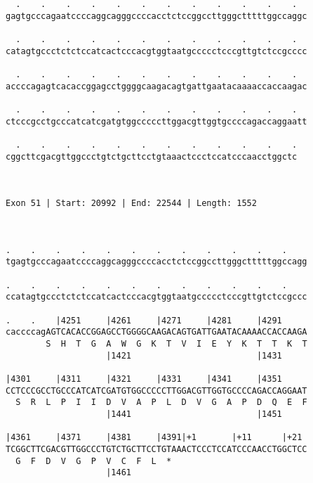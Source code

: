 \documentclass{article}
\begin{document}
\begin{Verbatim}
  .    .    .    .    .    .    .    .    .    .    .    .  
gagtgcccagaatccccaggcagggccccacctctccggccttgggctttttggccaggc
                                                            
  .    .    .    .    .    .    .    .    .    .    .    .  
catagtgccctctctccatcactcccacgtggtaatgccccctcccgttgtctccgcccc
                                                            
  .    .    .    .    .    .    .    .    .    .    .    .  
accccagagtcacaccggagcctggggcaagacagtgattgaatacaaaaccaccaagac
                                                            
  .    .    .    .    .    .    .    .    .    .    .    .  
ctcccgcctgcccatcatcgatgtggcccccttggacgttggtgccccagaccaggaatt
                                                            
  .    .    .    .    .    .    .    .    .    .    .    .
cggcttcgacgttggccctgtctgcttcctgtaaactccctccatcccaacctggctc
                                                          
                                                          
 
Exon 51 | Start: 20992 | End: 22544 | Length: 1552



.    .    .    .    .    .    .    .    .    .    .    .    
tgagtgcccagaatccccaggcagggccccacctctccggccttgggctttttggccagg
                                                            
.    .    .    .    .    .    .    .    .    .    .    .    
ccatagtgccctctctccatcactcccacgtggtaatgccccctcccgttgtctccgccc
                                                            
.    .    |4251     |4261     |4271     |4281     |4291     
caccccagAGTCACACCGGAGCCTGGGGCAAGACAGTGATTGAATACAAAACCACCAAGA
        S  H  T  G  A  W  G  K  T  V  I  E  Y  K  T  T  K  T
                    |1421                         |1431     
  
|4301     |4311     |4321     |4331     |4341     |4351     
CCTCCCGCCTGCCCATCATCGATGTGGCCCCCTTGGACGTTGGTGCCCCAGACCAGGAAT
  S  R  L  P  I  I  D  V  A  P  L  D  V  G  A  P  D  Q  E  F
                    |1441                         |1451     
  
|4361     |4371     |4381     |4391|+1       |+11      |+21 
TCGGCTTCGACGTTGGCCCTGTCTGCTTCCTGTAAACTCCCTCCATCCCAACCTGGCTCC
  G  F  D  V  G  P  V  C  F  L  *   
                    |1461                                   
  

\end{Verbatim}
\end{document}
